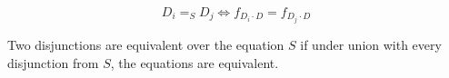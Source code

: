 \documentclass[12pt, letterpaper]{article}
\begin{document}
\begin{description}
{            \[D_i =_S D_j \Leftrightarrow f_{D_i \cdot D} = f_{D_j \cdot D} \]

            Two disjunctions are equivalent over the equation $S$ if 
            under union with every disjunction from $S$, the equations
            are equivalent.
        }
    \end{description}
\end{document}
